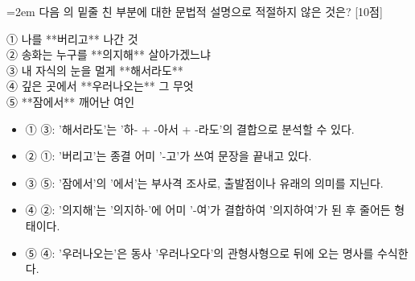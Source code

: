 \documentclass[10pt,a4paper]{article}
\newcommand{\qnum}[1]{%
  \tikz[baseline=(num.base)]{%
    \node[circle, fill=numCircle, text=white, inner sep=0pt,
          minimum size=18pt, font=\small\bfseries] (num) {#1};%
  }%
}
\newcommand{\pts}[1]{%
  \hfill\textcolor{ptsBadge}{[#1점]}%
}
\begin{document}
\vspace{4mm}
\begin{minipage}{\columnwidth}
{\hangindent=2em
\qnum{36}\enspace 다음 의 밑줄 친 부분에 대한 문법적 설명으로 적절하지 않은 것은? \pts{10}
\par}

\vspace{3mm}
\begin{tcolorbox}[bogi]
① 나를 **버리고** 나간 것 \\{}
② 송화는 누구를 **의지해** 살아가겠느냐 \\{}
③ 내 자식의 눈을 멀게 **해서라도** \\{}
④ 깊은 곳에서 **우러나오는** 그 무엇 \\{}
⑤ **잠에서** 깨어난 여인
\end{tcolorbox}
\vspace{3mm}
\begin{itemize}[leftmargin=2.5em, labelsep=0.3em, label={}, itemsep=4pt, parsep=1pt, topsep=0pt]
  \item ① ③: '해서라도'는 '하- + -아서 + -라도'의 결합으로 분석할 수 있다.
  \item ② ①: '버리고'는 종결 어미 '-고'가 쓰여 문장을 끝내고 있다.
  \item ③ ⑤: '잠에서'의 '에서'는 부사격 조사로, 출발점이나 유래의 의미를 지닌다.
  \item ④ ②: '의지해'는 '의지하-'에 어미 '-여'가 결합하여 '의지하여'가 된 후 줄어든 형태이다.
  \item ⑤ ④: '우러나오는'은 동사 '우러나오다'의 관형사형으로 뒤에 오는 명사를 수식한다.
\end{itemize}
\end{minipage}
\vspace{4mm}
\end{document}
